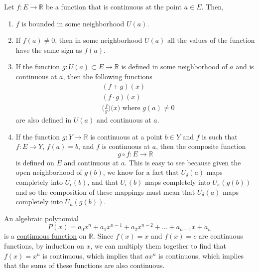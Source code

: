   \begin{theorem}
    \label{thm:local-properties-of-continuous-functions}
    Let $f: E \to \mathbb{R}$ be a function that is continuous at the point $a \in E$. Then, 
    \begin{enumerate}
      \item $f$ is bounded in some neighborhood $U(a)$. 
      \item If $f(a) \neq 0$, then in some neighborhood $U(a)$ all the values of the function have the same sign as $f(a)$. 
      \item If the function $g: U(a) \subset E \to \mathbb{R}$ is defined in some neighborhood of $a$ and is continuous at $a$, then the following functions 
        \begin{align}
          & (f + g) (x) \\
          & (f \cdot g) (x) \\
          & \bigg( \frac{f}{g} \bigg) \big( x \big) \text{ where } g(a) \neq 0
        \end{align}
        are also defined in $U(a)$ and continuous at $a$. 
      \item If the function $g: Y \to \mathbb{R}$ is continuous at a point $b \in Y$ and $f$ is such that $f: E \to Y$, $f(a) = b$, and $f$ is continuous at $a$, then the composite function 
        \begin{equation}
          g \circ f: E \to \mathbb{R}
        \end{equation}
        is defined on $E$ and continuous at $a$. This is easy to see because given the open neighborhood of $g(b)$, we know for a fact that $U_\delta (a)$ maps completely into $U_\epsilon (b)$, and that $U_\epsilon (b)$ maps completely into $U_\kappa (g(b))$ and so the composition of these mappings must mean that $U_\delta (a)$ maps completely into $U_\kappa (g(b))$. 
    \end{enumerate}
  \end{theorem}

  \begin{example}
    \label{ex:polynomials-are-continuous}
    An algebraic polynomial 
    \begin{equation}
      P(x) = a_0 x^n + a_1 x^{n-1} + a_2 x^{n-2} + \ldots + a_{n-1} x + a_n
    \end{equation}
    is a \hyperref[pst-def:continuous_func]{continuous function} on $\mathbb{R}$. Since $f(x) = x$ and $f(x) = c$ are continuous functions, by induction on $x$, we can multiply them together to find that $f(x) = x^n$ is continuous, which implies that $a x^n$ is continuous, which implies that the sums of these functions are also continuous. 
  \end{example}

